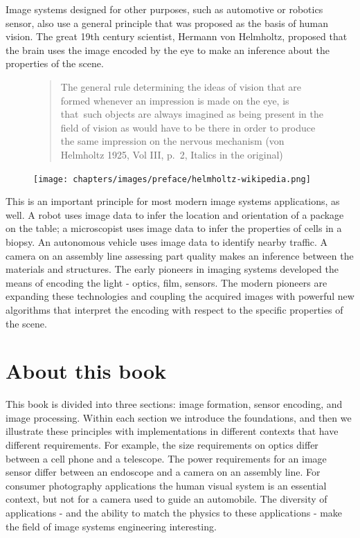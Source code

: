\documentclass[
  letterpaper,
]{book}
\begin{document}
Image systems designed for other purposes, such as automotive or
robotics sensor, also use a general principle that was proposed as the
basis of human vision. The great 19th century scientist, Hermann von
Helmholtz, proposed that the brain uses the image encoded by the eye to
make an inference about the properties of the scene.

\begin{figure}

\begin{minipage}{0.70\linewidth}

\begin{quote}
The general rule determining the ideas of vision that are formed
whenever an impression is made on the eye, is that~such objects are
always imagined as being present in the field of vision as would have to
be there in order to produce the same impression on the nervous
mechanism (von Helmholtz 1925, Vol III, p.~2, Italics in the original)
\end{quote}

\end{minipage}%
%
\begin{minipage}{0.30\linewidth}
\texttt{[image: chapters/images/preface/helmholtz-wikipedia.png]}\end{minipage}%

\end{figure}%

This is an important principle for most modern image systems
applications, as well. A robot uses image data to infer the location and
orientation of a package on the table; a microscopist uses image data to
infer the properties of cells in a biopsy. An autonomous vehicle uses
image data to identify nearby traffic. A camera on an assembly line
assessing part quality makes an inference between the materials and
structures. The early pioneers in imaging systems developed the means of
encoding the light - optics, film, sensors. The modern pioneers are
expanding these technologies and coupling the acquired images with
powerful new algorithms that interpret the encoding with respect to the
specific properties of the scene.

\section{About this book}\label{about-this-book}

This book is divided into three sections: image formation, sensor
encoding, and image processing. Within each section we introduce the
foundations, and then we illustrate these principles with
implementations in different contexts that have different requirements.
For example, the size requirements on optics differ between a cell phone
and a telescope. The power requirements for an image sensor differ
between an endoscope and a camera on an assembly line. For consumer
photography applications the human visual system is an essential
context, but not for a camera used to guide an automobile. The diversity
of applications - and the ability to match the physics to these
applications - make the field of image systems engineering interesting.
\end{document}

